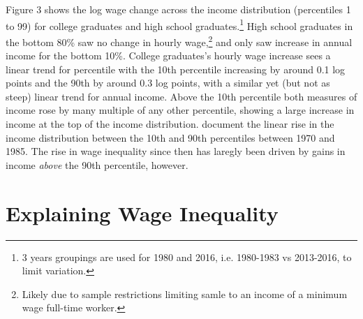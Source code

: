 \documentclass[notitlepage,12pt]{article}
\begin{document}
Figure 3 shows the log wage change across the income distribution (percentiles 1 to 99) for college graduates and high school graduates.\footnote{3 years groupings are used for 1980 and 2016, i.e. 1980-1983 vs 2013-2016, to limit variation.}  High school graduates in the bottom 80\% saw no change in hourly wage,\footnote{Likely due to sample restrictions limiting samle to an income of a minimum wage full-time worker.} and only saw increase in annual income for the bottom 10\%.  College graduates's hourly wage increase sees a linear trend for percentile with the 10th percentile increasing by around 0.1 log points and the 90th by around 0.3 log points, with a similar yet (but not as steep) linear trend for annual income.  Above the 10th percentile both measures of income rose by many multiple of any other percentile, showing a large increase in income at the top of the income distribution.  \cite{juhn1993wage} document the linear rise in the income distribution between the 10th and 90th percentiles between 1970 and 1985.  The rise in wage inequality since then has laregly been driven by gains in income \textit{above} the 90th percentile, however.

\section{Explaining Wage Inequality}
\end{document}
